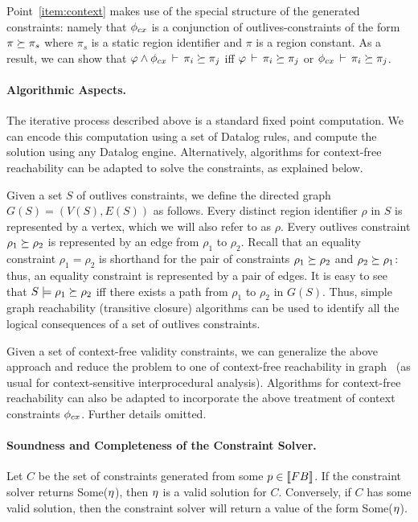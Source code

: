 Point~\ref{item:context} makes use of the special structure of the generated
constraints: namely that $\phi_{cx}$  is a conjunction of outlives-constraints of the
form $\pi \succeq \pi_s$ where $\pi_s$ is a static region identifier and $\pi$ is a
region constant. As a result, we can show that $\varphi \wedge \phi_{cx}\,\vdash\,\pi_i \succeq \pi_j$
iff $\varphi\,\vdash\,\pi_i \succeq \pi_j$ or $\phi_{cx}\,\vdash\,\pi_i \succeq \pi_j$.

\paragraph{Algorithmic Aspects.}
The iterative process described above is a standard fixed point computation.
We can encode this computation using a set of Datalog rules,
and compute the solution using any Datalog engine.
Alternatively, algorithms for context-free reachability can be adapted
to solve the constraints, as explained below.

Given a set $S$ of outlives constraints, we define the directed
graph $G(S)=(V(S),E(S))$ as follows.
Every distinct region identifier $\rho$ in $S$ is represented by a vertex,
which we will also refer to as $\rho$.
Every outlives constraint $\rho_1 \succeq \rho_2$ is represented by
an edge from $\rho_1$ to $\rho_2$.
Recall that an equality constraint $\rho_1 = \rho_2$ is shorthand
for the pair of constraints $\rho_1 \succeq \rho_2$ and
$\rho_2 \succeq \rho_1$: thus, an equality constraint is represented
by a pair of edges.
%
It is easy to see that $S \models \rho_1 \succeq \rho_2$ iff
there exists a path from $\rho_1$ to $\rho_2$ in $G(S)$.
%
Thus, simple graph reachability (transitive closure) algorithms can be
used to identify all the logical consequences of a set of outlives
constraints.

Given a set of context-free validity constraints, we can generalize the
above approach and reduce the problem to one of context-free reachability
in graph~\cite{Reps:Reachability} (as usual for context-sensitive interprocedural analysis).
%
Algorithms for context-free reachability can also be adapted to incorporate
the above treatment of context constraints $\phi_{cx}$.
%
Further details omitted.

\paragraph{Soundness and Completeness of the Constraint Solver.}

\begin{theorem}
  \label{thm:constraint-solver-sc}
Let $C$ be the set of constraints generated from some $p \in \llbracket {\sc FB} \rrbracket$.
If the constraint solver returns Some($\eta$), then $\eta$ is a valid solution
for $C$.
Conversely, if $C$ has some valid solution, then the constraint solver will return
a value of the form Some($\eta$).
\end{theorem}

